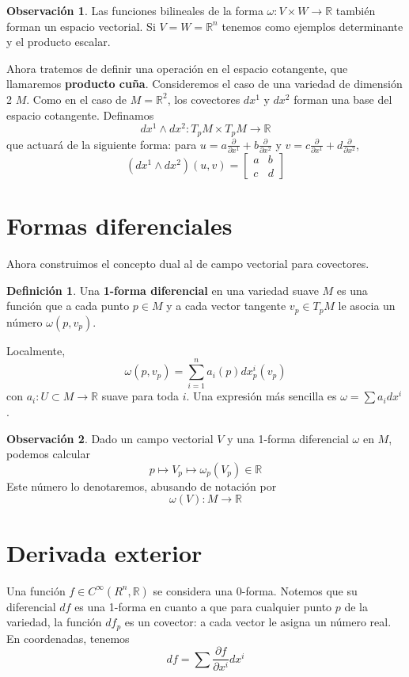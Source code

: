 \documentclass[spanish]{book}
\theoremstyle{definition}
\newtheorem*{defn}{Definición}
\newtheorem*{obs}{Observación}
\newcommand{\R}{\mathbb{R}}
\newcommand{\Cinf}{C^\infty}
\begin{document}
	\begin{obs}
		Las funciones bilineales de la forma $\omega:V\times W\to\R$ también forman un espacio vectorial. Si $V=W=\R^n$ tenemos como ejemplos determinante y el producto escalar.
	\end{obs}
	
	Ahora tratemos de definir una operación en el espacio cotangente, que llamaremos \textbf{producto cuña}. Consideremos el caso de una variedad de dimensión 2 $M$. Como en el caso de $M=\R^2$, los covectores $dx^1$ y $dx^2$ forman una base del espacio cotangente. Definamos
	\[dx^1\wedge dx^2:T_pM\times T_pM\to\R\]
	que actuará de la siguiente forma: para $u=a\frac{\partial}{\partial x^1}+b\frac{\partial}{\partial x^2}$ y $v=c\frac{\partial}{\partial x^1}+d\frac{\partial}{\partial x^2}$,
	\[(dx^1\wedge dx^2)(u,v)=\begin{bmatrix}
		a&b\\
		c&d
	\end{bmatrix}\]
	\section{Formas diferenciales}
	Ahora construimos el concepto dual al de campo vectorial para covectores.
	\begin{defn}
		Una \textbf{1-forma diferencial} en una variedad suave $M$ es una función que a cada punto $p\in M$ y a cada vector tangente $v_p\in T_pM$ le asocia un número $\omega(p,v_p)$.
	\end{defn}
	Localmente,
	\[\omega(p,v_p)=\sum_{i=1}^na_i(p)dx^i_p(v_p)\]
	con $a_i:U\subset M\to\R$ suave para toda $i$. Una expresión más sencilla es $\omega=\sum a_idx^i$.
	\begin{obs}
		Dado un campo vectorial $V$ y una 1-forma diferencial $\omega$ en $M$, podemos calcular
		\[p\mapsto V_p\mapsto\omega_p(V_p)\in\R\]
		Este número lo denotaremos, abusando de notación por
		\[\omega(V):M\to\R\]
	\end{obs}
	
	\section{Derivada exterior}
	Una función $f\in\Cinf(R^n,\R)$ se considera una 0-forma. Notemos que su diferencial $df$ es una 1-forma en cuanto a que para cualquier punto $p$ de la variedad, la función $df_p$ es un covector: a cada vector le asigna un número real. En coordenadas, tenemos
	\[df=\sum\frac{\partial f}{\partial x^i}dx^i\]
	
\end{document}
